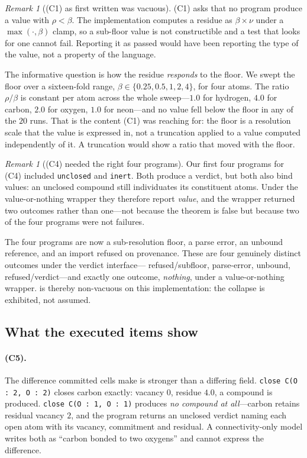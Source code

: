 \documentclass[11pt,twocolumn,a4paper]{article}
\theoremstyle{thmstyle}
\theoremstyle{definition}
\theoremstyle{remark}
\newtheorem{remark}[theorem]{Remark}
\newcommand{\flo}{\beta}
\newcommand{\res}{\rho}
\newcommand{\hj}[1]{\texttt{#1}}
\begin{document}
\begin{remark}[(C1) as first written was vacuous]
\label{rem:c1-vacuous}
(C1) asks that no program produce a value with $\res<\flo$. The
implementation computes a residue as $\flo\times\nu$ under a
$\max(\cdot,\flo)$ clamp, so a sub-floor value is not constructible and
a test that looks for one cannot fail. Reporting it as passed would have
been reporting the type of the value, not a property of the language.

The informative question is how the residue \emph{responds} to the
floor. We swept the floor over a sixteen-fold range,
$\flo\in\{0.25,0.5,1,2,4\}$, for four atoms. The ratio $\res/\flo$ is
constant per atom across the whole sweep---$1.0$ for hydrogen, $4.0$ for
carbon, $2.0$ for oxygen, $1.0$ for neon---and no value fell below the
floor in any of the $20$ runs. That is the content (C1) was reaching
for: the floor is a resolution scale that the value is expressed in, not
a truncation applied to a value computed independently of it. A
truncation would show a ratio that moved with the floor.
\end{remark}

\begin{remark}[(C4) needed the right four programs]
\label{rem:c4-programs}
Our first four programs for (C4) included \hj{unclosed} and \hj{inert}.
Both produce a verdict, but both also bind values: an unclosed compound
still individuates its constituent atoms. Under the value-or-nothing
wrapper they therefore report \emph{value}, and the wrapper returned two
outcomes rather than one---not because the theorem is false but because
two of the four programs were not failures.

The four programs are now a sub-resolution floor, a parse error, an
unbound reference, and an import refused on provenance. These are four
genuinely distinct outcomes under the verdict interface---
\textsf{refused}/\textsf{subfloor}, \textsf{parse-error},
\textsf{unbound}, \textsf{refused}/verdict---and exactly one outcome,
\emph{nothing}, under a value-or-nothing wrapper. 
is thereby non-vacuous on this implementation: the collapse is
exhibited, not assumed.
\end{remark}

\subsection{What the executed items show}

\paragraph{(C5).} The difference committed cells make is stronger than a
differing field. \hj{close C(O : 2, O : 2)} closes carbon exactly:
vacancy $0$, residue $4.0$, a compound is produced. \hj{close C(O : 1,
O : 1)} produces \emph{no compound at all}---carbon retains residual
vacancy $2$, and the program returns an \textsf{unclosed} verdict naming
each open atom with its vacancy, commitment and residual. A
connectivity-only model writes both as ``carbon bonded to two oxygens''
and cannot express the difference.
\end{document}
